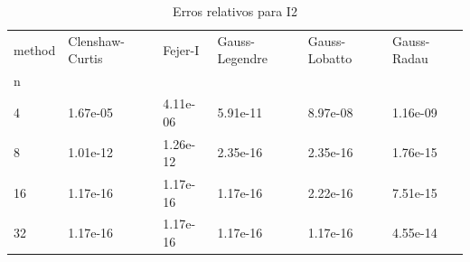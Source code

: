 \begin{table}
\centering
\caption{Erros relativos para I2}
\label{tab:errors_I2}
\begin{tabular}{llllll}
\toprule
method & Clenshaw-Curtis &   Fejer-I & Gauss-Legendre & Gauss-Lobatto & Gauss-Radau \\
n  &                 &           &                &               &             \\
\midrule
4  &        1.67e-05 &  4.11e-06 &       5.91e-11 &      8.97e-08 &    1.16e-09 \\
8  &        1.01e-12 &  1.26e-12 &       2.35e-16 &      2.35e-16 &    1.76e-15 \\
16 &        1.17e-16 &  1.17e-16 &       1.17e-16 &      2.22e-16 &    7.51e-15 \\
32 &        1.17e-16 &  1.17e-16 &       1.17e-16 &      1.17e-16 &    4.55e-14 \\
\bottomrule
\end{tabular}
\end{table}
